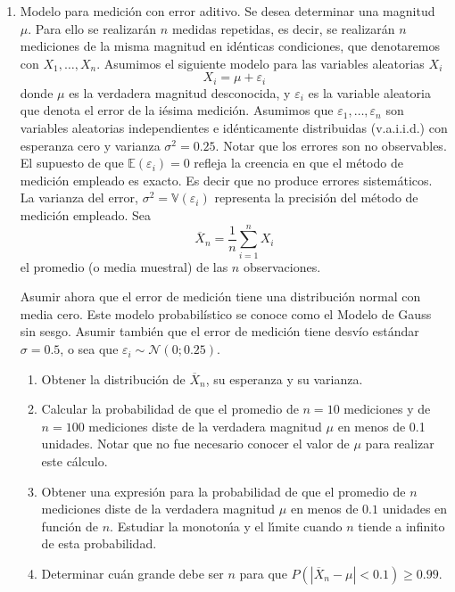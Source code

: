 \documentclass[11pt,a4paper,twoside]{article}%
\begin{document}
\begin{enumerate}
\item \label{medidas repetidas} Modelo para medici\'on  con error aditivo.  Se 
desea determinar una magnitud $\mu.$ Para ello se realizar\'an $n$ medidas 
repetidas, es decir, se realizar\'{a}n $n$ mediciones de la misma magnitud en 
id\'{e}nticas condiciones, que denotaremos con $X_{1},\dots,X_{n}$. Asumimos 
el siguiente modelo para las variables aleatorias $X_{i}$
\[
X_{i}=\mu+\varepsilon_{i}
\]
donde $\mu$ es la verdadera magnitud desconocida, y $\varepsilon_{i}$ es la
variable aleatoria que denota el error de la i\'{e}sima medici\'{o}n. Asumimos
que $\varepsilon_{1},\dots,\varepsilon_{n}$ son variables aleatorias
independientes e id\'{e}nticamente distribuidas (v.a.i.i.d.) con esperanza
cero y varianza $\sigma^{2}=0.25$. Notar que los errores son no observables. El
supuesto de que $\mathbb{E}(\varepsilon_{i})=0$ refleja la creencia en que el
m\'{e}todo de medici\'{o}n empleado es exacto. Es decir que no produce errores
sistem\'{a}ticos. La varianza del error, 
$\sigma^{2}=\mathbb{V}(\varepsilon_{i})$
representa la precisi\'{o}n del m\'{e}todo de medici\'{o}n empleado. Sea
\[
\overline{X}_{n}=\frac{1}{n}\sum_{i=1}^{n}X_{i}
\]
el promedio (o media muestral) de las $n$ observaciones. 


Asumir ahora que el error de medici\'on tiene una distribuci\'on normal con media cero. Este modelo
probabil\'istico se conoce como el Modelo de Gauss sin sesgo. Asumir tambi\'en que el error de medici\'{o}n tiene desv\'io est\'andar $\sigma=0.5$, o sea que $\varepsilon_{i}\sim\mathcal{N}(0;0.25)$.
\begin{enumerate}
	\item  Obtener la distribuci\'{o}n de $\overline{X}_{n}$, su esperanza y
	su varianza.
	
	\item Calcular la probabilidad de que el promedio de $n=10$ mediciones y
	de $n=100$ mediciones diste de la verdadera magnitud $\mu$ en menos de 0.1
	unidades. Notar que no fue necesario conocer el valor de $\mu$ para realizar
	este c\'{a}lculo. 
	
	\item Obtener una expresi\'{o}n para la probabilidad de que el promedio de 
$n$ mediciones diste de la verdadera magnitud $\mu$ en menos de $0.1$ 
unidades en funci\'{o}n de $n$. Estudiar la  monoton\'{\i}a y el l\'{\i}mite 
cuando $n$ tiende a infinito de esta probabilidad.
	
	\item  Determinar cu\'an grande debe ser $n$ para que $P\left(  |\overline
	{X}_{n}-\mu|<0.1\right)  \geq0.99$. 
	

\end{enumerate}
\end{enumerate}
\end{document}
